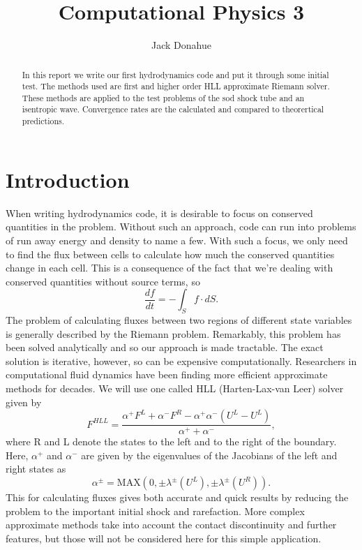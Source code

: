 \documentclass{article}
\title{Computational Physics 3}
\author{Jack Donahue}
\begin{document}
\maketitle
\doublespacing

\begin{abstract}
In this report we write our first hydrodynamics code and put it through some initial test. The methods used are first and higher order HLL approximate Riemann solver. These methods are applied to the test problems of the sod shock tube and an isentropic wave. Convergence rates are the calculated and compared to theorertical predictions.
\end{abstract}
\section*{Introduction}

When writing hydrodynamics code, it is desirable to focus on conserved quantities in the problem. Without such an approach, code can run into problems of run away energy and density to name a few. With such a focus, we only need to find the flux between cells to calculate how much the conserved quantities change in each cell. This is a consequence of the fact that we're dealing with conserved quantities without source terms, so 
\begin{equation}
    \frac{df}{dt}= - \int_{S} f \cdot dS.
\end{equation}
The problem of calculating fluxes between two regions of different state variables is generally described by the Riemann problem. Remarkably, this problem has been solved analytically and so our approach is made tractable. The exact solution is iterative, however, so can be expensive computationally. Researchers in computational fluid dynamics have been finding more efficient approximate methods for decades. We will use one called HLL (Harten-Lax-van Leer) solver given by 
\begin{equation}
    F^{HLL} = \frac{\alpha^+ F^{L}+\alpha^- F^{R} - \alpha^+ \alpha^- (U^{L} - U^{L})}{\alpha^+ + \alpha^-},
\end{equation}
where R and L denote the states to the left and to the right of the boundary. Here, $\alpha^+$ and $\alpha^-$ are given by the eigenvalues of the Jacobians of the left and right states as
\begin{equation}
    \alpha^{\pm} = \mbox{MAX}(0,\pm \lambda^\pm(U^{L}),\pm \lambda^\pm(U^{R}) ).
\end{equation}
This for calculating fluxes gives both accurate and quick results by reducing the problem to the important initial shock and rarefaction. More complex approximate methods take into account the contact discontinuity and further features, but those will not be considered here for this simple application. 
\end{document}
